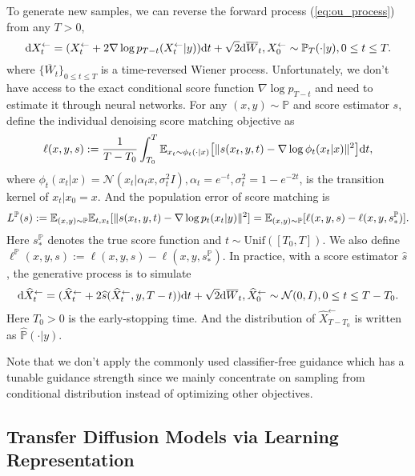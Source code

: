 \documentclass[11pt]{article}
\numberwithin{equation}{section}
\renewcommand{\P}{\mathbb{P}}
\renewcommand{\eqref}[1]{(\ref{#1})}
\begin{document}
To generate new samples, we can reverse the forward process \eqref{eq:ou_process} from any $T>0$,
\begin{equation}
    \dif X_t^{\leftarrow} = (X_t^{\leftarrow} + 2\nabla\log p_{T-t}(X_t^{\leftarrow}|y))\dif t + \sqrt{2}\dif \overline{W}_t, X_0^\leftarrow\sim \P_T(\cdot|y), 0\leq t\leq T.
\end{equation}
where $\{\overline{W}_t\}_{0\leq t\leq T}$ is a time-reversed Wiener process. Unfortunately, we don't have access to the exact conditional score function $\nabla\log p_{T-t}$ and need to estimate it through neural networks.
For any $(x,y)\sim\P$ and score estimator $s$, define the individual denoising score matching objective \citep{vincent2011connection} as
\begin{equation}\label{eq:dsm}
    \ell(x,y,s):=\frac{1}{T-T_0}\int_{T_0}^T \mathbb{E}_{x_t\sim \phi_t(\cdot|x)}\big[\|s(x_t,y,t)-\nabla\log \phi_t(x_t|x)\|^2\big] \mathrm{d} t,
\end{equation}
where $\phi_t(x_t|x)=\mathcal{N}(x_t|\alpha_tx,\sigma_t^2I),\alpha_t=e^{-t},\sigma_t^2=1-e^{-2t}$, is the transition kernel of $x_t|x_0=x$. 
And the population error of score matching is
\begin{equation}\label{eq:sm}
    L^\P(s):=\E_{(x,y)\sim\P}\E_{t,x_t}[\|s(x_t,y,t)-\nabla\log p_t(x_t|y)\|^2]=\E_{(x,y)\sim\P}[\ell(x,y,s)-\ell(x,y,s^\P_*)].
\end{equation}
Here $s^\P_*$ denotes the true score function and $t\sim \text{Unif}([T_0,T])$.
We also define $\ell^\P(x,y,s):=\ell(x,y,s)-\ell(x,y,s_*^\P)$.
In practice, with a score estimator $\widehat{s}$, the generative process is to simulate
\begin{equation}
    \mathrm{d} \widehat{X}_t^{\leftarrow} = (\widehat{X}_t^{\leftarrow} + 2\widehat{s}(\widehat{X}_t^\leftarrow,y,T-t))\mathrm{d} t + \sqrt{2}\mathrm{d} \overline{W}_t, \widehat{X}_0^\leftarrow\sim \mathcal{N}(0,I), 0\leq t\leq T-T_0.
\end{equation}
Here $T_0>0$ is the early-stopping time.
And the distribution of $\widehat{X}_{T-T_0}^\leftarrow$ is written as $\widehat{\P}(\cdot|y)$.

Note that we don't apply the commonly used classifier-free guidance \citep{ho2022classifier} which has a tunable guidance strength since we mainly concentrate on sampling from conditional distribution instead of optimizing other objectives.

\subsection{Transfer Diffusion Models via Learning Representation}
\end{document}
